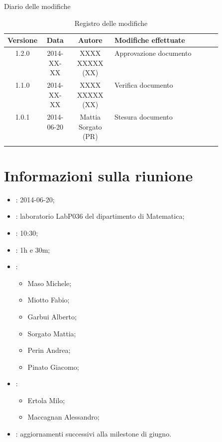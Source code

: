 
\newpage
Diario delle modifiche
\begin{center}
\begin{longtable}{|c|c|c|p{0.5\linewidth}|}
\toprule
\textbf{Versione} & \textbf{Data} & \textbf{Autore} & \textbf{Modifiche effettuate}\\


\midrule
1.2.0 & 2014-XX-XX & XXXX XXXXX (XX) & Approvazione documento \\	%
\midrule
1.1.0 & 2014-XX-XX & XXXX XXXXX (XX) & Verifica documento \\		%
\midrule
1.0.1 & 2014-06-20 & Mattia Sorgato (PR) & Stesura documento \\

\bottomrule
\caption{Registro delle modifiche}
\label{tab:changelog}
\end{longtable}
\end{center}

\newpage
\tableofcontents


\newpage
\section{Informazioni sulla riunione}%
\label{1.0}
\begin{itemize}
\item {}: 2014-06-20;
\item {}: laboratorio LabP036 del dipartimento di Matematica;
\item {}: 10:30;
\item {}: 1h e 30m;
\item {}: \NomeGruppo{}
\begin{itemize}
\item Maso Michele;
\item Miotto Fabio;
\item Garbui Alberto;
\item Sorgato Mattia;
\item Perin Andrea;
\item Pinato Giacomo;
\end{itemize}
\item {}: \Prop{}
\begin{itemize}
\item Ertola Milo;
\item Maccagnan Alessandro;
\end{itemize}
\item {}: aggiornamenti successivi alla milestone di giugno.
\end{itemize}

